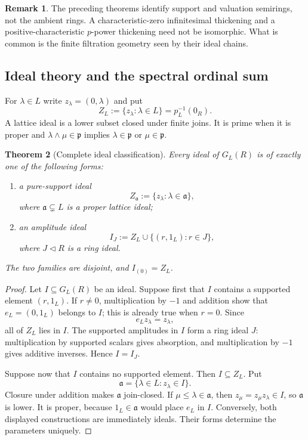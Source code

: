 \documentclass[11pt]{amsart}
\numberwithin{equation}{section}
\newtheorem{theorem}{Theorem}[section]
\theoremstyle{definition}
\newtheorem{remark}[theorem]{Remark}
\begin{document}
\begin{remark}
The preceding theorems identify support and valuation semirings, not the
ambient rings.  A characteristic-zero infinitesimal thickening and a
positive-characteristic $p$-power thickening need not be isomorphic.  What
is common is the finite filtration geometry seen by their ideal chains.
\end{remark}


\subsection{Ideal theory and the spectral ordinal sum}

For $\lambda\in L$ write $z_\lambda=(0,\lambda)$ and put
\[
Z_L:=\{z_\lambda:\lambda\in L\}=p_L^{-1}(0_R).
\]
A lattice ideal is a lower subset closed under finite joins.  It is prime
when it is proper and
$\lambda\wedge\mu\in\mathfrak p$ implies
$\lambda\in\mathfrak p$ or $\mu\in\mathfrak p$.

\begin{theorem}[Complete ideal classification]
\label{thm:lattice-ideal-classification}
Every ideal of $G_L(R)$ is of exactly one of the following forms:
\begin{enumerate}[label=\textup{(\roman*)}]
\item a pure-support ideal
\[
Z_{\mathfrak a}:=\{z_\lambda:\lambda\in\mathfrak a\},
\]
where $\mathfrak a\subsetneq L$ is a proper lattice ideal;
\item an amplitude ideal
\[
I_J:=Z_L\cup\{(r,1_L):r\in J\},
\]
where $J\triangleleft R$ is a ring ideal.
\end{enumerate}
The two families are disjoint, and $I_{(0)}=Z_L$.
\end{theorem}

\begin{proof}
Let $I\subseteq G_L(R)$ be an ideal.  Suppose first that $I$ contains a
supported element $(r,1_L)$.  If $r\neq0$, multiplication by $-1$ and
addition show that $e_L=(0,1_L)$ belongs to $I$; this is already true when
$r=0$.  Since
\[
e_Lz_\lambda=z_\lambda,
\]
all of $Z_L$ lies in $I$.  The supported amplitudes in $I$ form a ring
ideal $J$: multiplication by supported scalars gives absorption, and
multiplication by $-1$ gives additive inverses.  Hence $I=I_J$.

Suppose now that $I$ contains no supported element.  Then $I\subseteq Z_L$.
Put
\[
\mathfrak a=\{\lambda\in L:z_\lambda\in I\}.
\]
Closure under addition makes $\mathfrak a$ join-closed.  If
$\mu\leq\lambda\in\mathfrak a$, then
$z_\mu=z_\mu z_\lambda\in I$, so $\mathfrak a$ is lower.  It is proper,
because $1_L\in\mathfrak a$ would place $e_L$ in $I$.  Conversely, both
displayed constructions are immediately ideals.  Their forms determine
the parameters uniquely.
\end{proof}
\end{document}
